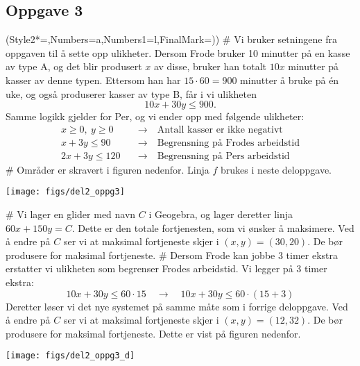 \subsection*{Oppgave 3}
\begin{easylist}[enumerate]
	\ListProperties(Style2*=,Numbers=a,Numbers1=l,FinalMark={)})
	# Vi bruker setningene fra oppgaven til å sette opp ulikheter. Dersom Frode bruker 10 minutter på en kasse av type A, og det blir produsert $x$ av disse, bruker han totalt $10x$ minutter på kasser av denne typen. Ettersom han har $15 \cdot 60 = 900$ minutter å bruke på én uke, og også produserer kasser av type B, får i vi ulikheten
	\begin{equation*}
		10x + 30 y \leq 900.
	\end{equation*}
	Samme logikk gjelder for Per, og vi ender opp med følgende ulikheter:
	\begin{align*}
		x \geq 0, \ y \geq 0 & \quad \rightarrow \quad \text{Antall kasser er ikke negativt} \\
		x + 3y \leq 90 & \quad \rightarrow \quad \text{Begrensning på Frodes arbeidstid} \\
		2x + 3y \leq 120 & \quad \rightarrow \quad \text{Begrensning på Pers arbeidstid}
	\end{align*}
	# Områder er skravert i figuren nedenfor. Linja $f$ brukes i neste deloppgave.
	\begin{center}
		\texttt{[image: figs/del2\_oppg3]}
	\end{center}
	# Vi lager en glider med navn $C$ i Geogebra, og lager deretter linja $60x + 150 y = C$. Dette er den totale fortjenesten, som vi ønsker å maksimere. Ved å endre på $C$ ser vi at maksimal fortjeneste skjer i $(x, y) = (30, 20)$. De bør produsere  for maksimal fortjeneste.
	# Dersom Frode kan jobbe 3 timer ekstra erstatter vi ulikheten som begrenser Frodes arbeidstid. Vi legger på 3 timer ekstra:
	\begin{equation*}
		10x + 30y \leq 60 \cdot 15 \quad \rightarrow \quad10x + 30y \leq 60 \cdot (15 + 3)
	\end{equation*}
	Deretter løser vi det nye systemet på samme måte som i forrige deloppgave. Ved å endre på $C$ ser vi at maksimal fortjeneste skjer i $(x, y) = (12, 32)$. De bør produsere  for maksimal fortjeneste. Dette er vist på figuren nedenfor.
	
	\begin{center}
		\texttt{[image: figs/del2\_oppg3\_d]}
	\end{center}
\end{easylist}

